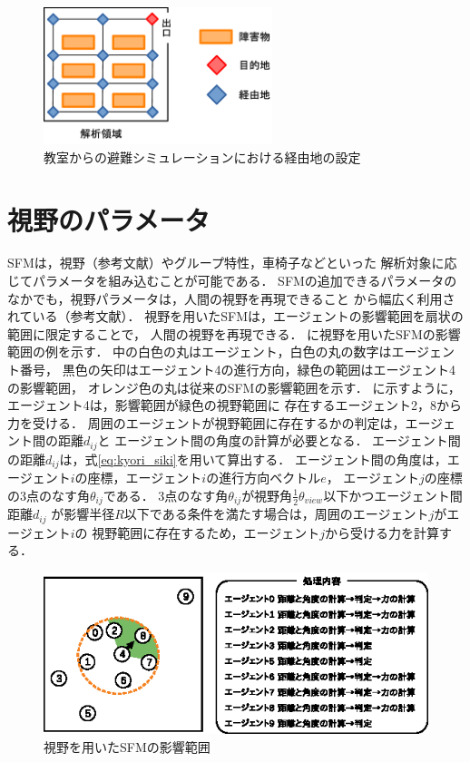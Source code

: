 \begin{figure}[t]
 \begin{center}
  \includegraphics[height=4cm,clip]{figure/keiyuti_ex2.eps}
  \caption{教室からの避難シミュレーションにおける経由地の設定}
  \label{fig:jitumondai_ex}
 \end{center}
\end{figure}

\section{視野のパラメータ}
SFMは，視野（参考文献）やグループ特性，車椅子などといった
解析対象に応じてパラメータを組み込むことが可能である．
SFMの追加できるパラメータのなかでも，視野パラメータは，人間の視野を再現できること
から幅広く利用されている（参考文献）．
視野を用いたSFMは，エージェントの影響範囲を扇状の範囲に限定することで，
人間の視野を再現できる．
に視野を用いたSFMの影響範囲の例を示す．
中の白色の丸はエージェント，白色の丸の数字はエージェント番号，
黒色の矢印はエージェント4の進行方向，緑色の範囲はエージェント4の影響範囲，
オレンジ色の丸は従来のSFMの影響範囲を示す．
に示すように，エージェント4は，影響範囲が緑色の視野範囲に
存在するエージェント2，8から力を受ける．
周囲のエージェントが視野範囲に存在するかの判定は，エージェント間の距離$d_{ij}$と
エージェント間の角度の計算が必要となる．
エージェント間の距離$d_{ij}$は，式\eqref{eq:kyori_siki}を用いて算出する．
エージェント間の角度は，エージェント$i$の座標，エージェント$i$の進行方向ベクトル$e$，
エージェント$j$の座標の3点のなす角$\theta_{ij}$である．
3点のなす角$\theta_{ij}$が視野角$\frac{1}{2}\theta_{view}$以下かつエージェント間距離$d_{ij}$
が影響半径$R$以下である条件を満たす場合は，周囲のエージェント$j$がエージェント$i$の
視野範囲に存在するため，エージェント$j$から受ける力を計算する．


\begin{figure}[h]
 \begin{center}
  \includegraphics[width=11.5cm,clip]{figure/eikyo_hankei_siya.eps}
  \caption{視野を用いたSFMの影響範囲}
  \label{fig:siya_hani}
 \end{center}
\end{figure}

